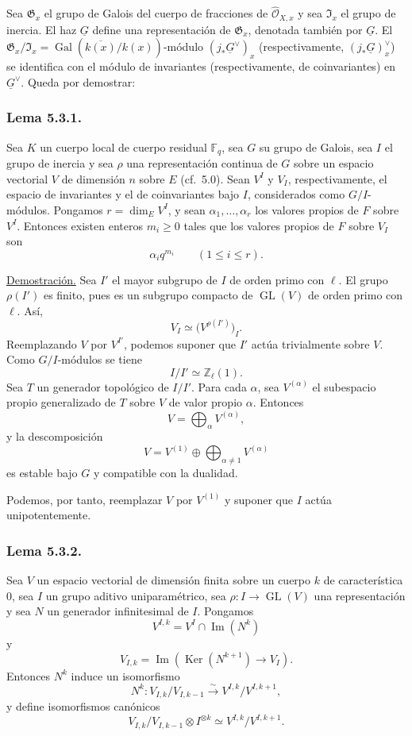 \pageoriginale

Sea $\mathfrak G_x$ el grupo de Galois del cuerpo de fracciones de
$\widehat{\mathcal O}_{X,x}$ y sea $\mathfrak I_x$ el grupo de inercia.
El haz $\underline G$ define una representación de $\mathfrak G_x$,
denotada también por $\underline G$. El
$\mathfrak G_x/\mathfrak I_x=
\operatorname{Gal}(\overline{k(x)}/k(x))$-módulo
$(j_*\underline G^\vee)_x$ (respectivamente,
$(j_*\underline G)_x^\vee$) se identifica con el módulo de invariantes
(respectivamente, de coinvariantes) en $\underline G^\vee$. Queda por
demostrar:

\subsubsection*{Lema 5.3.1.}
Sea $K$ un cuerpo local de cuerpo residual $\mathbb F_q$, sea $G$ su
grupo de Galois, sea $I$ el grupo de inercia y sea $\rho$ una
representación continua de $G$ sobre un espacio vectorial $V$ de
dimensión $n$ sobre $E$ (cf.~5.0). Sean $V^I$ y $V_I$, respectivamente,
el espacio de invariantes y el de coinvariantes bajo $I$, considerados
como $G/I$-módulos. Pongamos $r=\dim_E V^I$, y sean
$\alpha_1,\ldots,\alpha_r$ los valores propios de $F$ sobre $V^I$.
Entonces existen enteros $m_i\geq0$ tales que los valores propios de $F$
sobre $V_I$ son
\[
\alpha_iq^{m_i}\qquad(1\leq i\leq r).
\]

\noindent\underline{Demostración.}
Sea $I'$ el mayor subgrupo de $I$ de orden primo con $\ell$. El grupo
$\rho(I')$ es finito, pues es un subgrupo compacto de
$\operatorname{GL}(V)$ de orden primo con $\ell$. Así,
\[
V_I\simeq\bigl(V^{\rho(I')}\bigr)_I.
\]
Reemplazando $V$ por $V^{I'}$, podemos suponer que $I'$ actúa trivialmente
sobre $V$. Como $G/I$-módulos se tiene
\[
I/I'\simeq\mathbb Z_\ell(1).
\]
Sea $T$ un generador topológico de $I/I'$. Para cada $\alpha$, sea
$V^{(\alpha)}$ el subespacio propio generalizado de $T$ sobre $V$ de
valor propio $\alpha$. Entonces
\[
V=\bigoplus_\alpha V^{(\alpha)},
\]
y la descomposición
\[
V=V^{(1)}\oplus\bigoplus_{\alpha\ne1}V^{(\alpha)}
\]
es estable bajo $G$ y compatible con la dualidad.

\pageoriginale

Podemos, por tanto, reemplazar $V$ por $V^{(1)}$ y suponer que $I$ actúa
unipotentemente.

\subsubsection*{Lema 5.3.2.}
Sea $V$ un espacio vectorial de dimensión finita sobre un cuerpo $k$ de
característica $0$, sea $I$ un grupo aditivo uniparamétrico, sea
$\rho:I\longrightarrow\operatorname{GL}(V)$ una representación y sea $N$
un generador infinitesimal de $I$. Pongamos
\[
V^{I,k}=V^I\cap\operatorname{Im}(N^k)
\]
y
\[
V_{I,k}=\operatorname{Im}\!\left(\operatorname{Ker}(N^{k+1})
\longrightarrow V_I\right).
\]
Entonces $N^k$ induce un isomorfismo
\[
N^k:V_{I,k}/V_{I,k-1}\xrightarrow{\sim}
V^{I,k}/V^{I,k+1},
\]
y define isomorfismos canónicos
\[
V_{I,k}/V_{I,k-1}\otimes I^{\otimes k}
\simeq V^{I,k}/V^{I,k+1}.
\]

